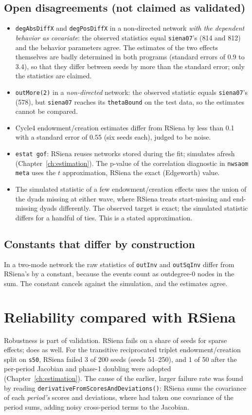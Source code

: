 \subsection{Open disagreements (not claimed as validated)}
\begin{itemize}
\item \texttt{degAbsDiffX} and \texttt{degPosDiffX} in a non-directed network \emph{with the dependent behavior as covariate}: the observed statistics equal \texttt{siena07}'s (814 and 812) and the behavior parameters agree. The estimates of the two effects themselves are badly determined in both programs (standard errors of 0.9 to 3.4), so that they differ between seeds by more than the standard error; only the statistics are claimed.
\item \texttt{outMore(2)} in a \emph{non-directed} network: the observed statistic equals \texttt{siena07}'s (578), but \texttt{siena07} reaches its \texttt{thetaBound} on the test data, so the estimates cannot be compared.
\item Cycle4 endowment/creation estimates differ from RSiena by less than 0.1 with a standard error of 0.55 (six seeds each), judged to be noise.
\item \texttt{estat gof}: RSiena reuses networks stored during the fit; \nwsaom{} simulates afresh (Chapter~\ref{ch:estimation}). The p-value of the correlation diagnostic in \texttt{nwsaom meta} uses the $t$ approximation, RSiena the exact (Edgeworth) value.
\item The simulated statistic of a few endowment/creation effects uses the union of the dyads missing at either wave, where RSiena treats start-missing and end-missing dyads differently. The observed target is exact; the simulated statistic differs for a handful of ties. This is a stated approximation.
\end{itemize}

\subsection{Constants that differ by construction}
In a two-mode network the raw statistics of \texttt{outInv} and \texttt{outSqInv} differ from RSiena's by a constant, because the events count as outdegree-0 nodes in the sum. The constant cancels against the simulation, and the estimates agree.

\section{Reliability compared with RSiena}
Robustness is part of validation. RSiena fails on a share of seeds for sparse effects; \nwsaom{} does as well. For the transitive reciprocated triplet endowment/creation split on \texttt{s50}, RSiena failed 3 of 200 seeds (seeds 51--250), and \nwsaom{} 1 of 50 after the per-period Jacobian and phase-1 doubling were adopted (Chapter~\ref{ch:estimation}). The cause of the earlier, larger failure rate was found by reading \texttt{derivativeFromScoresAndDeviations()}: RSiena sums the covariance of each \emph{period's} scores and deviations, where \nwsaom{} had taken one covariance of the period sums, adding noisy cross-period terms to the Jacobian.

